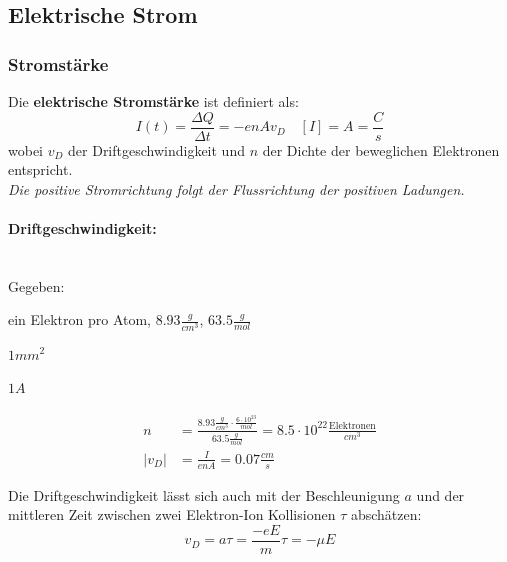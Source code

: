 \documentclass[7pt]{article}
\begin{document}
\begin{multicols*}{3}
\subsection{Elektrische Strom}

\subsubsection{Stromst{\"a}rke}

Die \textbf{elektrische Stromst{\"a}rke} ist definiert als:
\begin{equation*}
	I(t) = \frac{\Delta Q}{\Delta t} = -enAv_D \quad [I] = A = \frac{C}{s}
\end{equation*}
wobei $v_D$ der Driftgeschwindigkeit und $n$ der Dichte der beweglichen Elektronen entspricht. \\

\emph{Die positive Stromrichtung folgt der Flussrichtung der positiven Ladungen.} \\

\paragraph{Driftgeschwindigkeit:} \mbox{} \\

Gegeben:
\begin{description}[labelindent=16pt,style=multiline,leftmargin=4.2cm, noitemsep]
	\item[Kupferdraht:] ein Elektron pro Atom, $8.93 \frac{g}{cm^3}$, $63.5 \frac{g}{mol}$
	\item[Querschnittsfl{\"a}che:] $1mm^2$
	\item[Stromst{\"a}rke:] $1 A$
\end{description}

\begin{equation*}
\begin{split}
	n & = \frac{8.93 \frac{g}{cm^3} \cdot \frac{6 \cdot 10^{23}}{mol}}{63.5 \frac{g}{mol}} = 8.5 \cdot 10^{22} \frac{\text{Elektronen}}{cm^3} \\
	|v_D| & = \frac{I}{enA} = 0.07 \frac{cm}{s}
\end{split}
\end{equation*}

Die Driftgeschwindigkeit l{\"a}sst sich auch mit der Beschleunigung $a$ und der mittleren Zeit zwischen zwei Elektron-Ion Kollisionen $\tau$ absch{\"a}tzen:
\begin{equation*}
	v_D = a\tau = \frac{-eE}{m}\tau = -\mu E
\end{equation*}


\end{multicols*}
\end{document}

